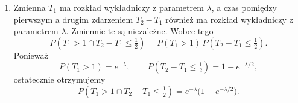 \begin{enumerate}
	      Korzystamy z niezależności \(N_A\) i \(N_B\): \(P = P(N_A=0) \cdot P(N_B \ge 3)\).

	      \begin{itemize}
		      \item \(P(N_A=0)\):
		            \[P(N_A=0) = e^{-\lambda/2}\]

		      \item \(P(N_B \ge 3)\):
		            \[P(N_B \ge 3) = 1 - P(N_B \le 2) = 1 - \left[ P(N_B=0) + P(N_B=1) + P(N_B=2) \right]\]
		            \[P(N_B \ge 3) = 1 - \left[ e^{-\lambda} \frac{\lambda^0}{0!} + e^{-\lambda} \frac{\lambda^1}{1!} + e^{-\lambda} \frac{\lambda^2}{2!} \right]\]
		            \[P(N_B \ge 3) = 1 - e^{-\lambda} \left( 1 + \lambda + \frac{\lambda^2}{2} \right)\]
	      \end{itemize}

	      Ostateczny wynik:
	      \begin{align*}
		      P\left(T_1>\tfrac12 \cap T_3\le \tfrac32\right) & = e^{-\lambda/2} \left[ 1 - e^{-\lambda} \left( 1 + \lambda + \frac{\lambda^2}{2} \right) \right] \\
		                                                      & = e^{-\lambda/2} - e^{-(\lambda/2 + \lambda)} \left( 1 + \lambda + \frac{\lambda^2}{2} \right)    \\
		                                                      & = e^{-\lambda/2} - e^{-3\lambda/2} \left( 1 + \lambda + \frac{\lambda^2}{2} \right)
	      \end{align*}

	\item[(vi)]
	      Zmienna \(T_1\) ma rozkład wykładniczy z parametrem \(\lambda\), a czas pomiędzy
	      pierwszym a drugim zdarzeniem \(T_2-T_1\) również ma rozkład wykładniczy z
	      parametrem \(\lambda\). Zmiennie te są niezależne. Wobec tego
	      \[
		      P\!\left(T_1>1 \cap T_2-T_1\le \tfrac12\right)
		      = P(T_1>1)\,P\!\left(T_2-T_1\le \tfrac12\right).
	      \]
	      Ponieważ
	      \[
		      P(T_1>1)=e^{-\lambda},
		      \qquad
		      P\!\left(T_2-T_1\le \tfrac12\right)=1-e^{-\lambda/2},
	      \]
	      ostatecznie otrzymujemy
	      \[
		      P\!\left(T_1>1 \cap T_2-T_1\le \tfrac12\right)
		      = e^{-\lambda}\bigl(1-e^{-\lambda/2}\bigr).
	      \]
\end{enumerate}
